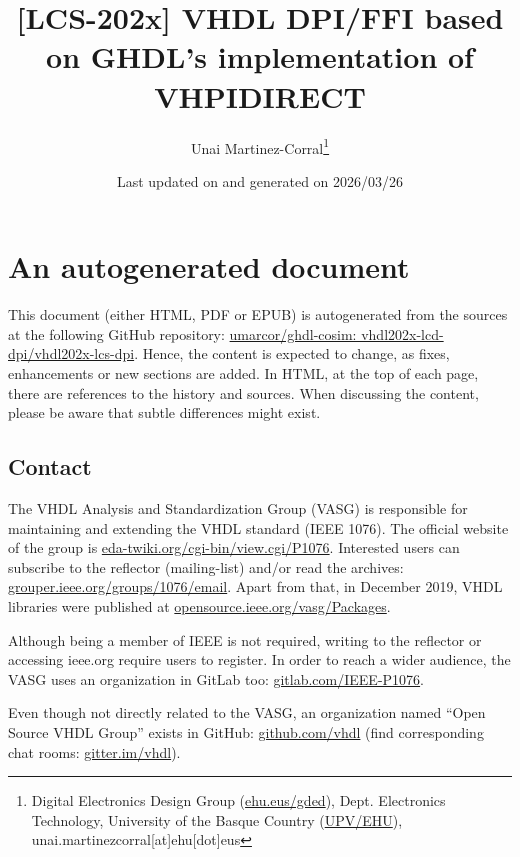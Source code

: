 \documentclass[
]{article}
\title{{[}LCS-202x{]} VHDL DPI/FFI based on GHDL's implementation of VHPIDIRECT}
\author{Unai Martinez-Corral\footnote{Digital Electronics Design Group (\href{https://ehu.eus/gded}{ehu.eus/gded}), Dept. Electronics Technology, University of the Basque Country (\href{https://ehu.eus}{UPV/EHU}), unai.martinezcorral{[}at{]}ehu{[}dot{]}eus}}
\date{Last updated on \href{https://github.com/umarcor/ghdl-cosim/commit/}{} and generated on 2026/03/26}
\begin{document}
\maketitle

{
\hypersetup{linkcolor=}
\setcounter{tocdepth}{4}
\tableofcontents
}
\listoffigures


\hypertarget{index}{%
\section*{An autogenerated document}\label{index}}

This document (either HTML, PDF or EPUB) is autogenerated from the sources at the following GitHub repository: \href{https://github.com/umarcor/ghdl-cosim/tree/develop/vhdl202x-lcs-dpi}{umarcor/ghdl-cosim: vhdl202x-lcd-dpi/vhdl202x-lcs-dpi}. Hence, the content is expected to change, as fixes, enhancements or new sections are added. In HTML, at the top of each page, there are references to the history and sources. When discussing the content, please be aware that subtle differences might exist.

\hypertarget{contact}{%
\subsection*{Contact}\label{contact}}

The VHDL Analysis and Standardization Group (VASG) is responsible for maintaining and extending the VHDL standard (IEEE 1076). The official website of the group is \href{http://www.eda-twiki.org/cgi-bin/view.cgi/P1076}{eda-twiki.org/cgi-bin/view.cgi/P1076}. Interested users can subscribe to the reflector (mailing-list) and/or read the archives: \href{http://grouper.ieee.org/groups/1076/email/thread.html}{grouper.ieee.org/groups/1076/email}. Apart from that, in December 2019, VHDL libraries were published at \href{https://opensource.ieee.org/vasg/Packages}{opensource.ieee.org/vasg/Packages}.

Although being a member of IEEE is not required, writing to the reflector or accessing ieee.org require users to register. In order to reach a wider audience, the VASG uses an organization in GitLab too: \href{https://gitlab.com/IEEE-P1076}{gitlab.com/IEEE-P1076}.

Even though not directly related to the VASG, an organization named ``Open Source VHDL Group'' exists in GitHub: \href{https://github.com/vhdl}{github.com/vhdl} (find corresponding chat rooms: \href{https://gitter.im/vhdl}{gitter.im/vhdl}).
\end{document}
